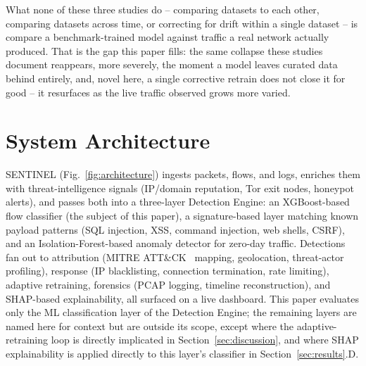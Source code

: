 \documentclass[conference]{IEEEtran}
\begin{document}
What none of these three studies do -- comparing datasets to each other,
comparing datasets across time, or correcting for drift within a single
dataset -- is compare a benchmark-trained model against traffic a real
network actually produced. That is the gap this paper fills: the same
collapse these studies document reappears, more severely, the moment a
model leaves curated data behind entirely, and, novel here, a single
corrective retrain does not close it for good -- it resurfaces as the
live traffic observed grows more varied.

\section{System Architecture}
\label{sec:architecture}

SENTINEL (Fig.~\ref{fig:architecture}) ingests packets, flows, and logs,
enriches them with threat-intelligence signals (IP/domain reputation, Tor
exit nodes, honeypot alerts), and passes both into a three-layer Detection
Engine: an XGBoost-based flow classifier (the subject of this paper), a
signature-based layer matching known payload patterns (SQL injection, XSS,
command injection, web shells, CSRF), and an Isolation-Forest-based anomaly
detector for zero-day traffic. Detections fan out to attribution (MITRE
ATT\&CK~\cite{mitreattack} mapping, geolocation, threat-actor profiling),
response (IP blacklisting, connection termination, rate limiting),
adaptive retraining, forensics (PCAP logging, timeline reconstruction), and
SHAP-based explainability, all surfaced on a live dashboard. This paper
evaluates only the ML classification layer of the Detection Engine; the
remaining layers are named here for context but are outside its scope,
except where the adaptive-retraining loop is directly implicated in
Section~\ref{sec:discussion}, and where SHAP explainability is applied
directly to this layer's classifier in Section~\ref{sec:results}.D.
\end{document}
